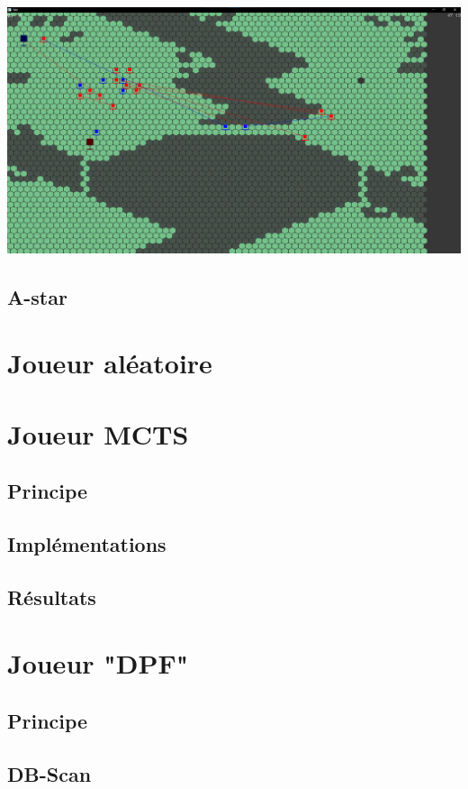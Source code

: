 \documentclass[french]{article}
\begin{document}
\includegraphics[width=\textwidth]{screen2.png}
\subsection{A-star}

\section{Joueur aléatoire}
\section{Joueur MCTS}
\subsection{Principe}
\subsection{Implémentations}
\subsection{Résultats}
\section{Joueur "DPF"}
\subsection{Principe}
\subsection{DB-Scan}
\end{document}
